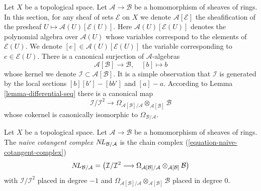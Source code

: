 \medskip\noindent
Let $X$ be a topological space. Let $\mathcal{A} \to \mathcal{B}$ be a
homomorphism of sheaves of rings. In this section, for any sheaf of sets
$\mathcal{E}$ on $X$ we denote $\mathcal{A}[\mathcal{E}]$ the sheafification
of the presheaf $U \mapsto \mathcal{A}(U)[\mathcal{E}(U)]$. Here
$\mathcal{A}(U)[\mathcal{E}(U)]$
denotes the polynomial algebra over $\mathcal{A}(U)$
whose variables correspond to the elements of $\mathcal{E}(U)$.
We denote $[e] \in \mathcal{A}(U)[\mathcal{E}(U)]$ the variable
corresponding to $e \in \mathcal{E}(U)$.
There is a canonical surjection of $\mathcal{A}$-algebras
\begin{equation}
\label{equation-canonical-presentation}
\mathcal{A}[\mathcal{B}] \longrightarrow \mathcal{B},\quad [b] \longmapsto b
\end{equation}
whose kernel we denote $\mathcal{I} \subset \mathcal{A}[\mathcal{B}]$.
It is a simple observation that $\mathcal{I}$ is generated by the
local sections $[b][b'] - [bb']$ and $[a] - a$. According to
Lemma \ref{lemma-differential-seq} there is a canonical map
\begin{equation}
\label{equation-naive-cotangent-complex}
\mathcal{I}/\mathcal{I}^2
\longrightarrow
\Omega_{\mathcal{A}[\mathcal{B}]/\mathcal{A}}
\otimes_{\mathcal{A}[\mathcal{B}]} \mathcal{B}
\end{equation}
whose cokernel is canonically isomorphic to $\Omega_{\mathcal{B}/\mathcal{A}}$.

\begin{definition}
\label{definition-naive-cotangent-complex}
Let $X$ be a topological space. Let $\mathcal{A} \to \mathcal{B}$ be a
homomorphism of sheaves of rings. The {\it naive cotangent complex}
$\mathop{N\!L}\nolimits_{\mathcal{B}/\mathcal{A}}$ is the chain complex
(\ref{equation-naive-cotangent-complex})
$$
\mathop{N\!L}\nolimits_{\mathcal{B}/\mathcal{A}} =
\left(\mathcal{I}/\mathcal{I}^2
\longrightarrow
\Omega_{\mathcal{A}[\mathcal{B}]/\mathcal{A}}
\otimes_{\mathcal{A}[\mathcal{B}]} \mathcal{B}\right)
$$
with $\mathcal{I}/\mathcal{I}^2$ placed in degree $-1$ and
$\Omega_{\mathcal{A}[\mathcal{B}]/\mathcal{A}}
\otimes_{\mathcal{A}[\mathcal{B}]} \mathcal{B}$
placed in degree $0$.
\end{definition}

